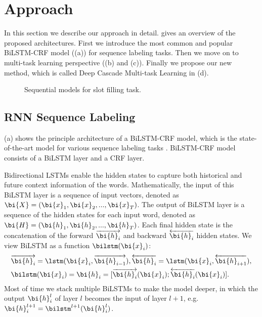 \section{Approach}
\label{sec:model}
In this section we describe our approach in detail.
 gives an overview of the proposed architectures.
First we introduce the most common and popular BiLSTM-CRF
model ((a)) for sequence labeling tasks.
Then we move on to multi-task learning perspective 
((b) and (c)).
Finally we propose our new method, which is called
Deep Cascade Multi-task Learning in (d).

\begin{figure}[th]
	\centering
	\caption{Sequential models for slot filling task.}
	\label{fig:model}
	\vspace{-10pt}
\end{figure}

\subsection{RNN Sequence Labeling}
\label{sec:rnn_sequence_labeling}

(a) 
shows the principle architecture of a BiLSTM-CRF model,
which is the state-of-the-art model for various sequence labeling tasks \cite{huang2015bidirectional,reimers2017optimal}.
BiLSTM-CRF model consists of a BiLSTM layer and a CRF layer. 

Bidirectional LSTMs enable the
hidden states to capture both historical and future
context information of the words.
Mathematically, the input of this BiLSTM layer
is a sequence of input vectors,
denoted as $\bi{X}=(\bi{x}_1, \bi{x}_2, ..., \bi{x}_T)$.
The output of BiLSTM layer is a sequence of the hidden
states for each input word, denoted
as $\bi{H}=(\bi{h}_1, \bi{h}_2, ..., \bi{h}_T)$.
Each final hidden state is the concatenation of the forward
$\overrightarrow{\bi{h}_i}$ and backward $\overleftarrow{\bi{h}_i}$ hidden states.
We view BiLSTM as a function $\bilstm(\bi{x}_i)$:
\begin{eqnarray*}
	& \overrightarrow{\bi{h}_i} = \lstm(\bi{x}_i, \overrightarrow{\bi{h}_{i-1}}),
	\overleftarrow{\bi{h}_i} = \lstm(\bi{x}_i, \overleftarrow{\bi{h}_{i+1}}), \\
	& \bilstm(\bi{x}_i) = \bi{h}_i = [\overrightarrow{\bi{h}_i}(\bi{x}_i);\overleftarrow{\bi{h}_i}(\bi{x}_i)].
\end{eqnarray*}
Most of time we stack multiple BiLSTMs to make the model deeper,
in which the output $\bi{h}_i^l$ of layer $l$ becomes the input of layer $l+1$,
e.g. $\bi{h}_i^{l+1}=\bilstm^{l+1}(\bi{h}_i^l)$.

